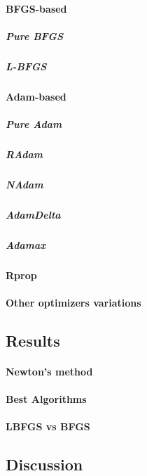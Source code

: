 \paragraph{BFGS-based}
\subparagraph{Pure BFGS}
\subparagraph{L-BFGS}
\paragraph{Adam-based}
\subparagraph{Pure Adam}
\subparagraph{RAdam}
\subparagraph{NAdam}
\subparagraph{AdamDelta}
\subparagraph{Adamax}
\paragraph{Rprop}
\paragraph{Other optimizers variations}

\subsection{Results}
\paragraph{Newton's method}
\paragraph{Best Algorithms}
\paragraph{LBFGS vs BFGS}

\subsection{Discussion}
